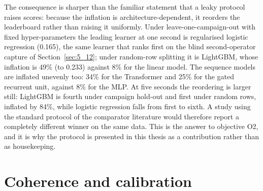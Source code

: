 The consequence is sharper than the familiar statement that a leaky protocol raises scores: because the inflation is architecture-dependent, it reorders the leaderboard rather than raising it uniformly. Under leave-one-campaign-out with fixed hyper-parameters the leading learner at one second is regularised logistic regression (0.165), the same learner that ranks first on the blind second-operator capture of Section~\ref{sec:5_12}; under random-row splitting it is LightGBM, whose inflation is 49\% (to 0.233) against 8\% for the linear model. The sequence models are inflated unevenly too: 34\% for the Transformer and 25\% for the gated recurrent unit, against 8\% for the MLP. At five seconds the reordering is larger still: LightGBM is fourth under campaign hold-out and first under random rows, inflated by 84\%, while logistic regression falls from first to sixth. A study using the standard protocol of the comparator literature would therefore report a completely different winner on the same data. This is the answer to objective O2, and it is why the protocol is presented in this thesis as a contribution rather than as housekeeping.


\section{Coherence and calibration}
\label{sec:5_4}


